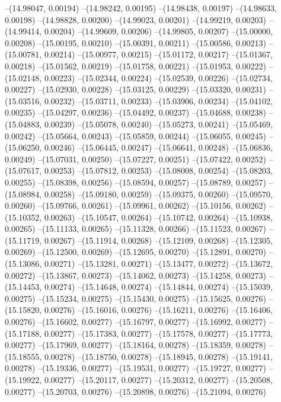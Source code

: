 --(14.98047, 0.00194)
--(14.98242, 0.00195)
--(14.98438, 0.00197)
--(14.98633, 0.00198)
--(14.98828, 0.00200)
--(14.99023, 0.00201)
--(14.99219, 0.00203)
--(14.99414, 0.00204)
--(14.99609, 0.00206)
--(14.99805, 0.00207)
--(15.00000, 0.00208)
--(15.00195, 0.00210)
--(15.00391, 0.00211)
--(15.00586, 0.00213)
--(15.00781, 0.00214)
--(15.00977, 0.00215)
--(15.01172, 0.00217)
--(15.01367, 0.00218)
--(15.01562, 0.00219)
--(15.01758, 0.00221)
--(15.01953, 0.00222)
--(15.02148, 0.00223)
--(15.02344, 0.00224)
--(15.02539, 0.00226)
--(15.02734, 0.00227)
--(15.02930, 0.00228)
--(15.03125, 0.00229)
--(15.03320, 0.00231)
--(15.03516, 0.00232)
--(15.03711, 0.00233)
--(15.03906, 0.00234)
--(15.04102, 0.00235)
--(15.04297, 0.00236)
--(15.04492, 0.00237)
--(15.04688, 0.00238)
--(15.04883, 0.00239)
--(15.05078, 0.00240)
--(15.05273, 0.00241)
--(15.05469, 0.00242)
--(15.05664, 0.00243)
--(15.05859, 0.00244)
--(15.06055, 0.00245)
--(15.06250, 0.00246)
--(15.06445, 0.00247)
--(15.06641, 0.00248)
--(15.06836, 0.00249)
--(15.07031, 0.00250)
--(15.07227, 0.00251)
--(15.07422, 0.00252)
--(15.07617, 0.00253)
--(15.07812, 0.00253)
--(15.08008, 0.00254)
--(15.08203, 0.00255)
--(15.08398, 0.00256)
--(15.08594, 0.00257)
--(15.08789, 0.00257)
--(15.08984, 0.00258)
--(15.09180, 0.00259)
--(15.09375, 0.00260)
--(15.09570, 0.00260)
--(15.09766, 0.00261)
--(15.09961, 0.00262)
--(15.10156, 0.00262)
--(15.10352, 0.00263)
--(15.10547, 0.00264)
--(15.10742, 0.00264)
--(15.10938, 0.00265)
--(15.11133, 0.00265)
--(15.11328, 0.00266)
--(15.11523, 0.00267)
--(15.11719, 0.00267)
--(15.11914, 0.00268)
--(15.12109, 0.00268)
--(15.12305, 0.00269)
--(15.12500, 0.00269)
--(15.12695, 0.00270)
--(15.12891, 0.00270)
--(15.13086, 0.00271)
--(15.13281, 0.00271)
--(15.13477, 0.00272)
--(15.13672, 0.00272)
--(15.13867, 0.00273)
--(15.14062, 0.00273)
--(15.14258, 0.00273)
--(15.14453, 0.00274)
--(15.14648, 0.00274)
--(15.14844, 0.00274)
--(15.15039, 0.00275)
--(15.15234, 0.00275)
--(15.15430, 0.00275)
--(15.15625, 0.00276)
--(15.15820, 0.00276)
--(15.16016, 0.00276)
--(15.16211, 0.00276)
--(15.16406, 0.00276)
--(15.16602, 0.00277)
--(15.16797, 0.00277)
--(15.16992, 0.00277)
--(15.17188, 0.00277)
--(15.17383, 0.00277)
--(15.17578, 0.00277)
--(15.17773, 0.00277)
--(15.17969, 0.00277)
--(15.18164, 0.00278)
--(15.18359, 0.00278)
--(15.18555, 0.00278)
--(15.18750, 0.00278)
--(15.18945, 0.00278)
--(15.19141, 0.00278)
--(15.19336, 0.00277)
--(15.19531, 0.00277)
--(15.19727, 0.00277)
--(15.19922, 0.00277)
--(15.20117, 0.00277)
--(15.20312, 0.00277)
--(15.20508, 0.00277)
--(15.20703, 0.00276)
--(15.20898, 0.00276)
--(15.21094, 0.00276)
